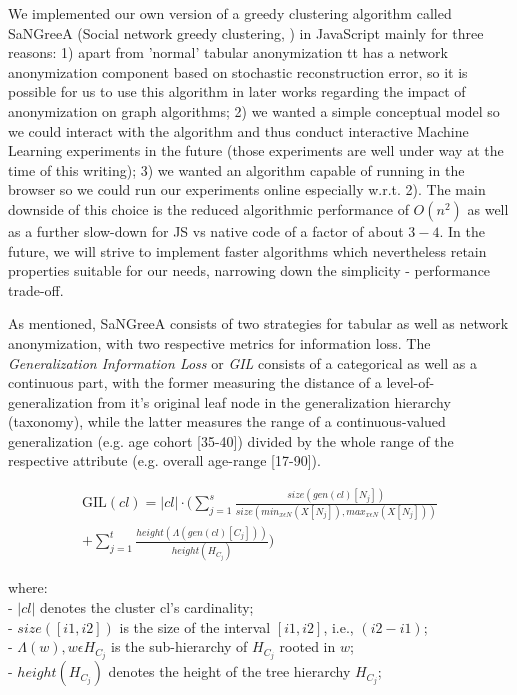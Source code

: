 \documentclass{llncs}
\providecommand{\abs}[1]{\lvert#1\rvert}
\begin{document}
We implemented our own version of a greedy clustering algorithm called SaNGreeA (Social network greedy clustering, \cite{campan2009data}) in JavaScript mainly for three reasons: 1) apart from 'normal' tabular anonymization tt has a network anonymization component based on stochastic reconstruction error, so it is possible for us to use this algorithm in later works regarding the impact of anonymization on graph algorithms; 2) we wanted a simple conceptual model so we could interact with the algorithm and thus conduct interactive Machine Learning experiments in the future (those experiments are well under way at the time of this writing); 3) we wanted an algorithm capable of running in the browser so we could run our experiments online especially w.r.t. 2). The main downside of this choice is the reduced algorithmic performance of $O(n^2)$ as well as a further slow-down for JS vs native code of a factor of about $3-4$. In the future, we will strive to implement faster algorithms which nevertheless retain properties suitable for our needs, narrowing down the simplicity - performance trade-off.

As mentioned, SaNGreeA consists of two strategies for tabular as well as network anonymization, with two respective metrics for information loss. The \textit{Generalization Information Loss} or \emph{GIL} consists of a categorical as well as a continuous part, with the former measuring the distance of a level-of-generalization from it's original leaf node in the generalization hierarchy (taxonomy), while the latter measures the range of a continuous-valued generalization (e.g. age cohort [35-40]) divided by the whole range of the respective attribute (e.g. overall age-range [17-90]).


\begin{equation*}
\begin{split}
\text{GIL}(cl) = \abs{cl} \cdot (\sum_{j=1}^{s} \frac{size(gen(cl)[N_j])}{size(min_{x \epsilon N} (X[N_j]), max_{x \epsilon N} (X[N_j]))} \\ 
+ \sum_{j=1}^{t} \frac{height(\Lambda(gen(cl)[C_j]))}{height(H_{C_j})})    
\end{split}
\end{equation*}


where:\\
- $\abs{cl}$ denotes the cluster cl's cardinality; \\
- $size([i1,i2])$ is the size of the interval $[i1,i2]$, i.e., $(i2-i1)$; \\
- $\Lambda(w), w \epsilon H_{C_j}$ is the sub-hierarchy of $H_{C_j}$ rooted in $w$; \\
- $height(H_{C_j})$ denotes the height of the tree hierarchy $H_{C_j}$; \\
\end{document}
